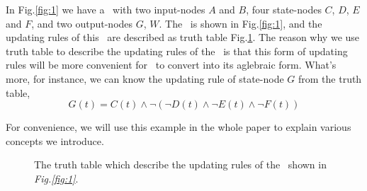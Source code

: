 \begin{example}
	In Fig.\ref{fig:1} we have a \BCN\ with two input-nodes $A$ and $B$, four state-nodes $C$, $D$, $E$ and $F$, and two output-nodes $G$, $W$. The \BCN\ is shown in Fig.\ref{fig:1}, and the updating rules of this \BCN\ are described as truth table Fig.\ref{fig:2}. The reason why we use truth table to describe the updating rules of the \BCN\ is that this form of updating rules will be more convenient for \BCN\ to convert into its aglebraic form. What's more, for instance, we can know the updating rule of state-node $G$ from the truth table,
	\[G(t)=C(t)\wedge \neg(\neg{D(t)}\wedge \neg E(t)\wedge \neg F(t))\]
	
	For convenience, we will use this example in the whole paper to explain various concepts we introduce.
  \begin{figure}[thpb]
      \centering
      
      \caption{The truth table which describe the updating rules of the \BCN\ shown in {\em Fig.\ref{fig:1}}.}
      \label{fig:2}
   \end{figure}
\end{example}   


